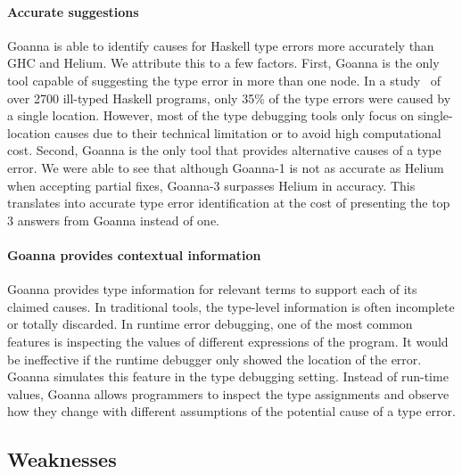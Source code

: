     \paragraph{\textbf{Accurate suggestions}} Goanna is able to identify causes for Haskell type errors more accurately than GHC and Helium. We attribute this to a few factors. First, Goanna is the only tool capable of suggesting the type error in more than one node. In a study~\cite{Wu2017-eb} of over 2700 ill-typed Haskell programs, only 35\% of the type errors were caused by a single location. However, most of the type debugging tools only focus on single-location causes due to their technical limitation or to avoid high computational cost. Second, Goanna is the only tool that provides alternative causes of a type error. We were able to see that although Goanna-1 is not as accurate as Helium when accepting partial fixes, Goanna-3 surpasses Helium in accuracy. This translates into accurate type error identification at the cost of presenting the top 3 answers from Goanna instead of one.
    

    \paragraph{\textbf{Goanna provides contextual information}}
    Goanna provides type information for relevant terms to support each of its claimed causes. In traditional tools, the type-level information is often incomplete or totally discarded. In runtime error debugging, one of the most common features is inspecting the values of different expressions of the program. It would be ineffective if the runtime debugger only showed the location of the error. Goanna simulates this feature in the type debugging setting. Instead of run-time values, Goanna allows programmers to inspect the type assignments and observe how they change with different assumptions of the potential cause of a type error. 

    \subsection{Weaknesses}

